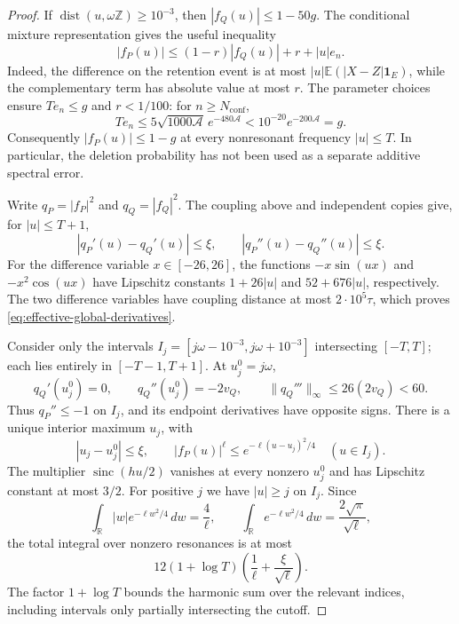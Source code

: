 \documentclass[aop]{imsart}
\theoremstyle{plain}
\theoremstyle{definition}
\theoremstyle{definition}
\newcommand{\EE}{\mathbb E}
\newcommand{\R}{\mathbb R}
\newcommand{\ind}{\mathbf 1}
\DeclareMathOperator{\dist}{dist}
\DeclareMathOperator{\sinc}{sinc}
\begin{document}
\begin{proof}
If $\dist(u,\omega\mathbb Z)\ge10^{-3}$, then
$|f_Q(u)|\le1-50g$.  The conditional mixture representation gives
the useful inequality
\begin{equation}\label{eq:effective-mixture-gap}
 |f_P(u)|\le(1-r)|f_Q(u)|+r+|u|e_n.
\end{equation}
Indeed, the difference on the retention event is at most
$|u|\EE(|X-Z|\ind_E)$, while the complementary term has absolute
value at most $r$.
The parameter choices ensure $Te_n\le g$ and $r<1/100$:
for $n\ge N_{\mathrm{conf}}$,
\[
 Te_n\le5\sqrt{1000\mathcal A}\,e^{-480\mathcal A}
       <10^{-20}e^{-200\mathcal A}=g.
\]
Consequently $|f_P(u)|\le1-g$ at every nonresonant frequency
$|u|\le T$.  In particular, the deletion probability has not been
used as a separate additive spectral error.

Write $q_P=|f_P|^2$ and $q_Q=|f_Q|^2$.
The coupling above and independent copies give, for $|u|\le T+1$,
\begin{equation}\label{eq:effective-global-derivatives}
 |q_P'(u)-q_Q'(u)|\le\xi,\qquad
 |q_P''(u)-q_Q''(u)|\le\xi.
\end{equation}
For the difference variable $x\in[-26,26]$, the functions
$-x\sin(ux)$ and $-x^2\cos(ux)$ have Lipschitz constants
$1+26|u|$ and $52+676|u|$, respectively.
The two difference variables have coupling distance at most
$2\cdot10^5\tau$, which proves \eqref{eq:effective-global-derivatives}.

Consider only the intervals
$I_j=[j\omega-10^{-3},j\omega+10^{-3}]$ intersecting $[-T,T]$;
each lies entirely in $[-T-1,T+1]$.
At $u_j^0=j\omega$,
\[
 q_Q'(u_j^0)=0,\qquad q_Q''(u_j^0)=-2v_Q,\qquad
 \|q_Q'''\|_\infty\le26(2v_Q)<60.
\]
Thus $q_P''\le-1$ on $I_j$, and its endpoint derivatives have
opposite signs.  There is a unique interior maximum $u_j$, with
\[
 |u_j-u_j^0|\le\xi,\qquad
 |f_P(u)|^\ell\le e^{-\ell(u-u_j)^2/4}\quad(u\in I_j).
\]
The multiplier $\sinc(hu/2)$ vanishes at every nonzero $u_j^0$ and
has Lipschitz constant at most $3/2$.  For positive $j$ we have
$|u|\ge j$ on $I_j$.  Since
\[
 \int_{\R}|w|e^{-\ell w^2/4}\,dw=\frac4\ell,\qquad
 \int_{\R}e^{-\ell w^2/4}\,dw=\frac{2\sqrt\pi}{\sqrt\ell},
\]
the total integral over nonzero resonances is at most
\[
 12(1+\log T)\left(\frac1\ell+\frac{\xi}{\sqrt\ell}\right).
\]
The factor $1+\log T$ bounds the harmonic sum over the relevant
indices, including intervals only partially intersecting the cutoff.


\end{proof}
\end{document}
